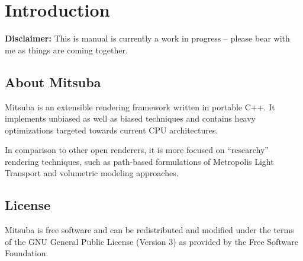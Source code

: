 \section{Introduction}
\textbf{Disclaimer:} This is manual is currently a work in progress --
please bear with me as things are coming together.

\subsection{About Mitsuba}
Mitsuba is an extensible rendering framework written in portable C++. It implements unbiased 
as well as biased techniques and contains heavy optimizations targeted towards current CPU 
architectures.

In comparison to other open renderers, it is more focused on ``researchy'' rendering
techniques, such as path-based formulations of Metropolis Light Transport and volumetric
modeling approaches.

\subsection{License}
Mitsuba is free software and can be redistributed and modified under the terms of the GNU General Public License (Version 3) as provided by the Free Software Foundation.

